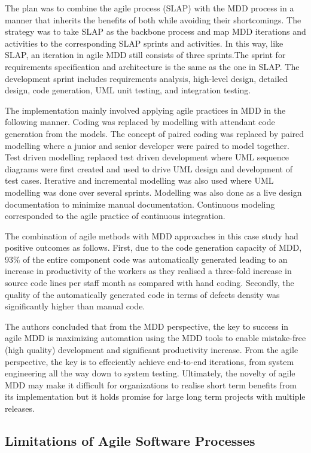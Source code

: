 \documentclass[10pt, a4paper, twocolumn]{article}
\begin{document}
The plan was to combine the agile process (SLAP) with the MDD process in a manner that inherits the benefits of both while avoiding their shortcomings. The strategy was to take SLAP as the backbone process and map MDD iterations and activities to the corresponding SLAP sprints and activities. In this way, like SLAP, an iteration in agile MDD still consists of three sprints.The sprint for requirements specification and architecture is the same as the one in SLAP. The development sprint includes requirements analysis, high-level design, detailed design, code generation, UML unit testing, and integration testing. 

The implementation mainly involved applying agile practices in MDD in the following manner. Coding was replaced by modelling with attendant code generation from the models. The concept of paired coding was replaced by paired modelling where a junior and senior developer were paired to model together. Test driven modelling replaced test driven development where UML sequence diagrams were first created and used to drive UML design and development of test cases. Iterative and incremental modelling was also used where UML modelling was done over several sprints. Modelling was also done as a live design documentation to minimize manual documentation. Continuous modeling corresponded to the agile practice of continuous integration.

The combination of agile methods with MDD approaches in this case study had positive outcomes as follows. First, due to the code generation capacity of MDD, 93\% of the entire component code was automatically generated leading to an increase in productivity of the workers as they realised a three-fold increase in source code lines per staff month as compared with hand coding. Secondly, the quality of the automatically generated code in terms of defects density was significantly higher than manual code. 

The authors concluded that from the MDD perspective, the key to success in agile MDD is maximizing automation using the MDD tools to enable mistake-free (high quality) development and significant productivity increase. From the agile perspective, the key is to effeciently achieve end-to-end iterations, from system engineering all the way down to system testing. Ultimately, the novelty of agile MDD may make it difficult for organizations to realise short term benefits from its implementation but it holds promise for large long term projects with multiple releases.

\subsection{Limitations of Agile Software Processes}
\end{document}
